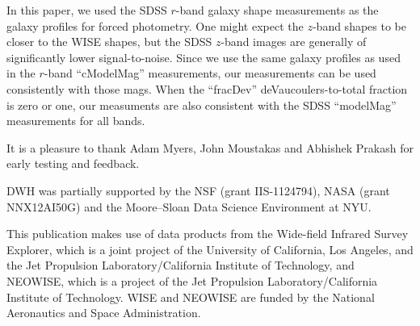 \documentclass[12pt,preprint]{aastex}
\begin{document}

In this paper, we used the SDSS $r$-band galaxy shape measurements as
the galaxy profiles for forced photometry.  One might expect the
$z$-band shapes to be closer to the WISE shapes, but the SDSS $z$-band
images are generally of significantly lower signal-to-noise.  Since we
use the same galaxy profiles as used in the $r$-band ``cModelMag''
measurements, our measurements can be used consistently with those
mags.  When the ``fracDev'' deVaucoulers-to-total fraction is zero or
one, our measuments are also consistent with the SDSS ``modelMag''
measurements for all bands.



%
%
%
% 
% 

\acknowledgements
%
It is a pleasure to thank Adam Myers, John Moustakas and Abhishek
Prakash for early testing and feedback.

DWH was partially supported by the NSF (grant IIS-1124794), NASA
(grant NNX12AI50G) and the Moore--Sloan Data Science Environment at
NYU.

This publication makes use of data products from the Wide-field
Infrared Survey Explorer, which is a joint project of the University
of California, Los Angeles, and the Jet Propulsion
Laboratory/California Institute of Technology, and NEOWISE, which is a
project of the Jet Propulsion Laboratory/California Institute of
Technology. WISE and NEOWISE are funded by the National Aeronautics
and Space Administration.
\end{document}
